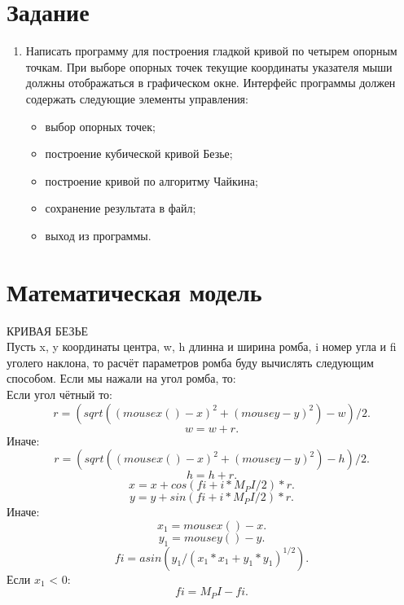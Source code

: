 \documentclass[14pt, a4paper]{extreport}
\begin{document}
\author{Савонин~М.В.}
\maketitle

\chapter{Задание}

\begin{enumerate}

	\item
	Написать программу для построения гладкой кривой по четырем опорным точкам. При выборе опорных точек текущие координаты указателя мыши 	должны отображаться в графическом окне. Интерфейс программы должен содержать следующие элементы управления:
	\begin{itemize}
		\item выбор опорных точек;
		\item построение кубической кривой Безье;
		\item построение кривой по алгоритму Чайкина;
		\item сохранение результата в файл;
		\item выход из программы.
	\end{itemize}

\end{enumerate}

\chapter{Математическая модель}

\MakeUppercase{Кривая Безье}\\
Пусть x, y координаты центра, w, h длинна и ширина ромба, i номер угла и fi уголего наклона, то расчёт параметров ромба буду вычислять следующим способом.
Если мы нажали на угол ромба, то:\\
Если угол чётный то:
$$ r = (sqrt((mousex()-x)^2+(mousey-y)^2) - w)/2 .$$
$$ w = w + r .$$
Иначе:
$$ r = (sqrt((mousex()-x)^2+(mousey-y)^2) - h)/2 .$$
$$ h = h + r .$$
$$x = x+cos(fi+i*M_PI/2)*r.$$
$$y = y+sin(fi+i*M_PI/2)*r.$$
Иначе:
$$ x_{1} = mousex() - x.$$
$$ y_{1} = mousey() - y.$$
$$ fi = asin(y_{1} / (x_{1}*x_{1} + y_{1}*y_{1})^{1/2}) .$$
Если $x_{1}$ < 0:
$$ fi = M_PI - fi .$$
\end{document}

